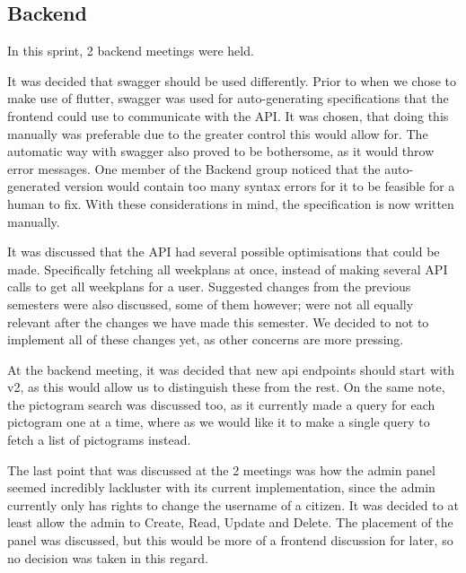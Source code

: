 \subsection{Backend}
In this sprint, 2 backend meetings were held.

It was decided that swagger should be used differently.
Prior to when we chose to make use of flutter, swagger was used for auto-generating specifications that the frontend could use to communicate with the API.
It was chosen, that doing this manually was preferable due to the greater control this would allow for.
The automatic way with swagger also proved to be bothersome, as it would throw error messages.
One member of the Backend group noticed that the auto-generated version would contain too many syntax errors for it to be feasible for a human to fix.
With these considerations in mind, the specification is now written manually.

It was discussed that the API had several possible optimisations that could be made.
Specifically fetching all weekplans at once, instead of making several API calls to get all weekplans for a user.
Suggested changes from the previous semesters were also discussed, some of them however; were not all equally relevant after the changes we have made this semester.
We decided to not to implement all of these changes yet, as other concerns are more pressing.

At the backend meeting, it was decided that new api endpoints should start with v2, as this would allow us to distinguish these from the rest.
On the same note, the pictogram search was discussed too, as it currently made a query for each pictogram one at a time, where as we would like it to make a single query to fetch a list of pictograms instead.

The last point that was discussed at the 2 meetings was how the admin panel seemed incredibly lackluster with its current implementation, since the admin currently only has rights to change the username of a citizen. It was decided to at least allow the admin to Create, Read, Update and Delete. The placement of the panel was discussed, but this would be more of a frontend discussion for later, so no decision was taken in this regard.
